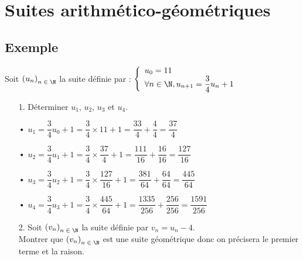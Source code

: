 \vspace*{-1.5cm}

\section{Suites arithmético-géométriques}

\subsection{Exemple }

Soit $\left(u_n\right)_{n\; \in \; \N}$ la suite définie par : $\left\{
  \begin{array}{lll}
    u_0 = 11 \\
    \forall n \in \N, u_{n+1} = \dfrac{3}{4}u_n + 1
  \end{array}
\right.$

\vspace*{.3cm}

\begin{itemize}
\item[1.] Déterminer $u_1$, $u_2$, $u_3$ et $u_4$. \\
\end{itemize}

\begin{itemize}
\item[•] $u_1 = \dfrac{3}{4}u_0 + 1 = \dfrac{3}{4} \times 11 + 1 = \dfrac{33}{4} + \dfrac{4}{4} = \dfrac{37}{4}$ \vspace*{.3cm} \\
\item[•] $u_2 = \dfrac{3}{4}u_1 + 1 = \dfrac{3}{4} \times \dfrac{37}{4} + 1 = \dfrac{111}{16} + \dfrac{16}{16} = \dfrac{127}{16}$ \vspace*{.3cm} \\
\item[•] $u_3 = \dfrac{3}{4}u_2 + 1 = \dfrac{3}{4} \times \dfrac{127}{16} + 1 = \dfrac{381}{64} + \dfrac{64}{64} = \dfrac{445}{64}$ \vspace*{.3cm} \\
\item[•] $u_4 = \dfrac{3}{4}u_3 + 1 = \dfrac{3}{4} \times \dfrac{445}{64} + 1 = \dfrac{1335}{256} + \dfrac{256}{256} = \dfrac{1591}{256}$ \vspace*{.3cm} \\
\end{itemize}

\begin{itemize}
\item[2.] Soit $\left(v_n\right)_{n\; \in \; \N}$ la suite définie par $v_n = u_n - 4$. \\ Montrer que $\left(v_n\right)_{n\; \in \; \N}$ est une suite géométrique donc on précisera le premier terme et la raison.
\end{itemize}

